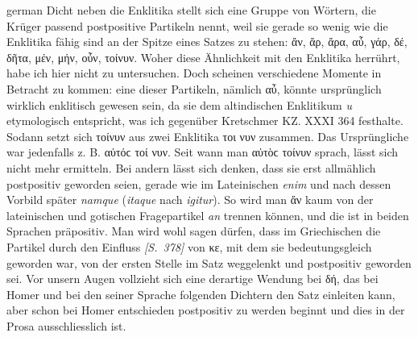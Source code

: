\begin{otherlanguage*}{german}
Dicht neben die Enklitika stellt sich eine Gruppe von Wörtern, die Krüger passend postpositive Partikeln nennt, weil sie gerade so wenig wie die Enklitika fähig sind an der Spitze eines Satzes zu stehen: ἄν, ἄρ, ἄρα, αὖ, γάρ, δέ, δῆτα, μέν, μήν, οὖν, τοίνυν. Woher diese Ähnlichkeit mit den Enklitika herrührt, habe ich hier nicht zu untersuchen. Doch scheinen verschiedene Momente in Betracht zu kommen: eine dieser Partikeln, nämlich αὖ, könnte ursprünglich wirklich enklitisch gewesen sein, da sie dem altindischen Enklitikum \emph{u} etymologisch entspricht, was ich gegenüber Kretschmer KZ. XXXI 364 festhalte. Sodann setzt sich τοίνυν aus zwei Enklitika τοι νυν zusammen. Das Ursprüngliche war jedenfalls z. B. αὐτόϲ τοί νυν. Seit wann man αὐτὸϲ τοίνυν sprach, lässt sich nicht mehr ermitteln. Bei andern lässt sich denken, dass sie erst allmählich postpositiv geworden seien, gerade wie im Lateinischen \emph{enim} und nach dessen Vorbild später \emph{namque} (\emph{itaque} nach \emph{igitur}). So wird man ἄν kaum von der lateinischen und gotischen Fragepartikel \emph{an} trennen können, und die ist in beiden Sprachen präpositiv. Man wird wohl sagen dürfen, dass im Griechischen die Partikel durch den Einfluss \hypertarget{p378}{\emph{[S.~378]}}\label{p378} von κε, mit dem sie bedeutungsgleich geworden war, von der ers\-ten Stelle im Satz weggelenkt und postpositiv geworden sei. Vor unsern Augen vollzieht sich eine derartige Wendung bei δή, das bei Homer und bei den seiner Sprache folgenden Dichtern den Satz einleiten kann, aber schon bei Homer entschieden postpositiv zu werden beginnt und dies in der Prosa ausschliesslich ist.


\end{otherlanguage*}
